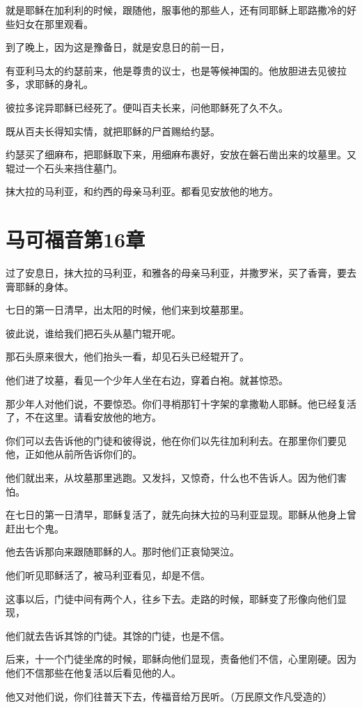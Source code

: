 \documentclass[12pt,oneside]{book}
\begin{document}
就是耶稣在加利利的时候，跟随他，服事他的那些人，还有同耶稣上耶路撒冷的好些妇女在那里观看。

到了晚上，因为这是豫备日，就是安息日的前一日，

有亚利马太的约瑟前来，他是尊贵的议士，也是等候神国的。他放胆进去见彼拉多，求耶稣的身礼。

彼拉多诧异耶稣已经死了。便叫百夫长来，问他耶稣死了久不久。

既从百夫长得知实情，就把耶稣的尸首赐给约瑟。

约瑟买了细麻布，把耶稣取下来，用细麻布裹好，安放在磐石凿出来的坟墓里。又辊过一个石头来挡住墓门。

抹大拉的马利亚，和约西的母亲马利亚。都看见安放他的地方。

\chapter{马可福音第16章}
过了安息日，抹大拉的马利亚，和雅各的母亲马利亚，并撒罗米，买了香膏，要去膏耶稣的身体。

七日的第一日清早，出太阳的时候，他们来到坟墓那里。

彼此说，谁给我们把石头从墓门辊开呢。

那石头原来很大，他们抬头一看，却见石头已经辊开了。

他们进了坟墓，看见一个少年人坐在右边，穿着白袍。就甚惊恐。

那少年人对他们说，不要惊恐。你们寻梢那钉十字架的拿撒勒人耶稣。他已经复活了，不在这里。请看安放他的地方。

你们可以去告诉他的门徒和彼得说，他在你们以先往加利利去。在那里你们要见他，正如他从前所告诉你们的。

他们就出来，从坟墓那里逃跑。又发抖，又惊奇，什么也不告诉人。因为他们害怕。

在七日的第一日清早，耶稣复活了，就先向抹大拉的马利亚显现。耶稣从他身上曾赶出七个鬼。

他去告诉那向来跟随耶稣的人。那时他们正哀恸哭泣。

他们听见耶稣活了，被马利亚看见，却是不信。

这事以后，门徒中间有两个人，往乡下去。走路的时候，耶稣变了形像向他们显现，

他们就去告诉其馀的门徒。其馀的门徒，也是不信。

后来，十一个门徒坐席的时候，耶稣向他们显现，责备他们不信，心里刚硬。因为他们不信那些在他复活以后看见他的人。

他又对他们说，你们往普天下去，传福音给万民听。（万民原文作凡受造的）
\end{document}
